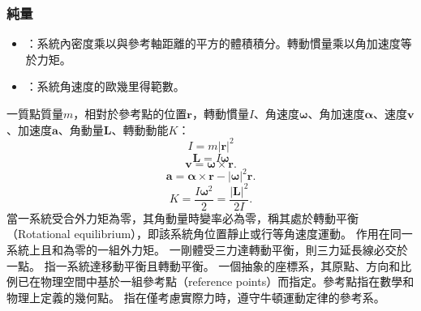 \documentclass[a4paper,12pt]{article}
\begin{document}
\subsubsection{純量}
\begin{itemize}
\item{}：系統內密度乘以與參考軸距離的平方的體積積分。轉動慣量乘以角加速度等於力矩。
\item{}：系統角速度的歐幾里得範數。
\end{itemize}
一質點質量$m$，相對於參考點的位置$\mathbf{r}$，轉動慣量$I$、角速度$\boldsymbol{\omega}$、角加速度$\boldsymbol{\alpha}$、速度$\mathbf{v}$、加速度$\mathbf{a}$、角動量$\mathbf{L}$、轉動動能$K$：
\[I=m|\mathbf{r}|^2\]
\[\mathbf{L}=I\boldsymbol{\omega}\]
\[\mathbf{v}=\boldsymbol{\omega}\times\mathbf{r}.\]
\[\mathbf{a}=\boldsymbol{\alpha}\times\mathbf{r}-|\boldsymbol{\omega}|^2\mathbf{r}.\]
\[K=\frac{I\boldsymbol{\omega}^2}{2}=\frac{|\mathbf{L}|^2}{2I}.\]
當一系統受合外力矩為零，其角動量時變率必為零，稱其處於轉動平衡（Rotational equilibrium），即該系統角位置靜止或行等角速度運動。
作用在同一系統上且和為零的一組外力矩。
一剛體受三力達轉動平衡，則三力延長線必交於一點。
指一系統達移動平衡且轉動平衡。
一個抽象的座標系，其原點、方向和比例已在物理空間中基於一組參考點（reference points）而指定。參考點指在數學和物理上定義的幾何點。
指在僅考慮實際力時，遵守牛頓運動定律的參考系。
\end{document}
